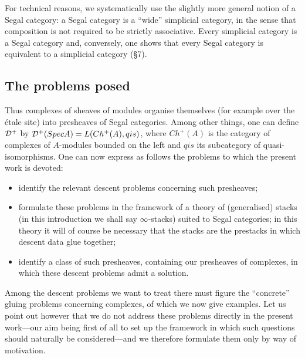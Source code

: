 For technical reasons, we systematically use the slightly more general
notion of a Segal category: a Segal category is a ``wide'' simplicial
category, in the sense that composition is not required to be strictly
associative. Every simplicial category is a Segal category and, conversely,
one shows that every Segal category is equivalent to a simplicial category
(\S7).

\subsection*{The problems posed}

Thus complexes of sheaves of modules organise themselves (for example over
the étale site) into presheaves of Segal categories. Among other things, one
can define ${\cal D}^+$ by ${\cal D}^+(Spec A)= L(Ch^+(A), qis)$, where
$Ch^+(A)$ is the category of complexes of $A$-modules bounded on the left and
$qis$ its subcategory of quasi-isomorphisms. One can now express as follows
the problems to which the present work is devoted:
\begin{itemize}
\item
identify the relevant descent problems concerning such presheaves;
\item
formulate these problems in the framework of a theory of (generalised)
stacks (in this introduction we shall say $\infty$-stacks) suited to Segal
categories; in this theory it will of course be necessary that the stacks are
the prestacks in which descent data glue together;
\item
identify a class of such presheaves, containing our presheaves of complexes,
in which these descent problems admit a solution.
\end{itemize}

Among the descent problems we want to treat there must figure the
``concrete'' gluing problems concerning complexes, of which we now give
examples. Let us point out however that we do not address these problems
directly in the present work---our aim being first of all to set up the
framework in which such questions should naturally be considered---and we
therefore formulate them only by way of motivation.

